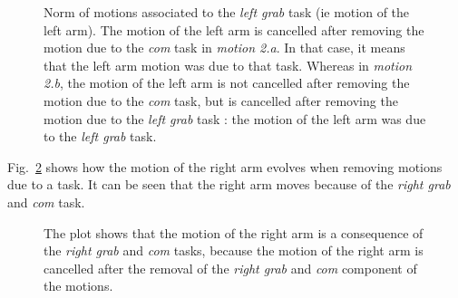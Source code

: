 \documentclass[letterpaper, 10pt, conference]{ieeeconf}      %
\begin{document}
\begin{figure}[t]
  \centering
  \subfigure[Motion 2.a]{
  \resizebox{.48\textwidth}{!} {
  
  }                           
  \label{fig:exp1:Evolution2L:a}
  }
  \subfigure[Motion 2.b]{
  \resizebox{.48\textwidth}{!} {
  
  }
  \label{fig:exp1:Evolution2L:b}
  }
  \caption{Norm of motions associated to the \emph{left grab} task (ie motion of the left arm).
  The motion of the left arm is cancelled after removing the motion due to the \emph{com} task
  in \emph{motion 2.a}. In that case, it means that the left arm motion was due to that task.
  Whereas in \emph{motion 2.b}, the motion of the left arm is not cancelled after
  removing the motion due to the \emph{com} task, but is cancelled after removing
  the motion due to the \emph{left grab} task : the motion of the left arm was due
  to the \emph{left grab} task.}
  \label{fig:exp1:Evolution2L}
\end{figure}

Fig.~\ref{fig:exp1:Evolution2R} shows how the motion of the right arm evolves when removing
motions due to a task. It can be seen that the right arm moves because of the \emph{right grab} and
\emph{com} task.
\begin{figure}[t]
  \centering
  \subfigure[Motion 2.a]{
  \resizebox{.48\textwidth}{!} {
  
  }                           
  \label{fig:exp1:Evolution2R:a}
  }
  \subfigure[Motion 2.b]{
  \resizebox{.48\textwidth}{!} {
  
  }
  \label{fig:exp1:Evolution2R:b}
  }
  \caption{The plot shows that
  the motion of the right arm is a consequence of the  
  \emph{right grab} and \emph{com} tasks, because the motion of the right arm is cancelled
  after the removal of the \emph{right grab} and \emph{com} component of the motions.}
  \label{fig:exp1:Evolution2R}
\end{figure}

\end{document}
